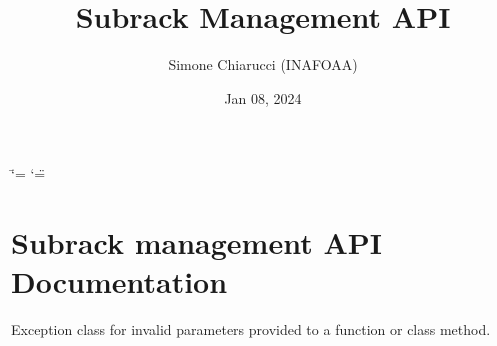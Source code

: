 \documentclass[letterpaper,10pt,english]{sphinxmanual}
\title{Subrack Management API}
\date{Jan 08, 2024}
\author{Simone Chiarucci (INAF\sphinxhyphen{}OAA)}
\begin{document}
\ifdefined\shorthandoff
  \ifnum\catcode`\=\string=\active\shorthandoff{=}\fi
  \ifnum\catcode`\"=\active{}\fi
\fi

\pagestyle{empty}
\sphinxmaketitle
\pagestyle{plain}
\sphinxtableofcontents
\pagestyle{normal}
\label{\detokenize{index::doc}}


\sphinxstepscope


\chapter{Subrack management API Documentation}
\label{\detokenize{apidocs:module-backplane}}\label{\detokenize{apidocs:subrack-management-api-documentation}}\label{\detokenize{apidocs::doc}}

\begin{fulllineitems}
\label{\detokenize{apidocs:backplane.BackplaneInvalidParameter}}
\pysigstartsignatures
{}
\pysigstopsignatures
\sphinxAtStartPar
Exception class for invalid parameters provided to a function or class method.

\end{fulllineitems}

\end{document}
